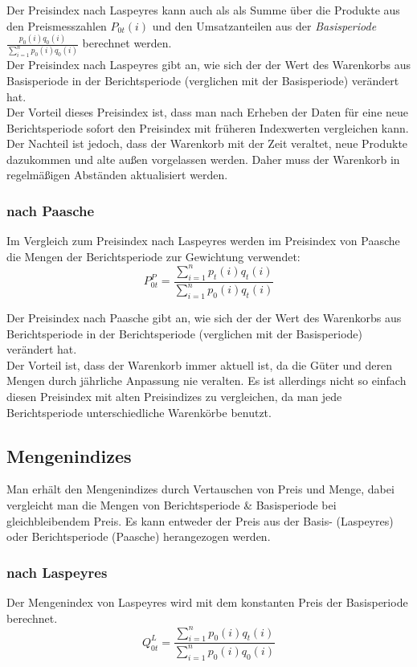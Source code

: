 \documentclass[a4paper]{article}
\newcommand\dangersign{%
 \makebox[1.8em][c]{%
 \makebox[0pt][c]{\raisebox{.15em}{\small!}}%
 \makebox[0pt][c]{\color{red}\Large$\triangle$}}}%
\begin{document}
\noindent \dangersign Der Preisindex nach Laspeyres kann auch als als Summe über die Produkte aus den Preismesszahlen $P_{0t}(i)$ und den Umsatzanteilen aus der \textit{Basisperiode} $\frac{p_0(i)q_0(i)}{\sum_{i=1}^n p_0(i)q_0(i)}$ berechnet werden. \\

\noindent Der Preisindex nach Laspeyres gibt an, wie sich der der Wert des Warenkorbs aus Basisperiode in der Berichtsperiode (verglichen mit der Basisperiode) verändert hat.\\
Der Vorteil dieses Preisindex ist, dass man nach Erheben der Daten für eine neue Berichtsperiode sofort den Preisindex mit früheren Indexwerten vergleichen kann. Der Nachteil ist jedoch, dass der Warenkorb mit der Zeit veraltet, neue Produkte dazukommen und alte außen vorgelassen werden. Daher muss der Warenkorb in regelmäßigen Abständen aktualisiert werden.

\subsubsection{nach Paasche}\label{sec:p-paasche}
Im Vergleich zum Preisindex nach Laspeyres werden im Preisindex von Paasche die Mengen der Berichtsperiode zur Gewichtung verwendet:
$$P_{0t}^P =\frac{\sum_{i=1}^n p_t(i)q_t(i)}{\sum_{i=1}^n p_0(i)q_t(i)}$$

\noindent Der Preisindex nach Paasche gibt an, wie sich der der Wert des Warenkorbs aus Berichtsperiode in der Berichtsperiode (verglichen mit der Basisperiode) verändert hat.\\
Der Vorteil ist, dass der Warenkorb immer aktuell ist, da die Güter und deren Mengen durch jährliche Anpassung nie veralten. Es ist allerdings nicht so einfach diesen Preisindex mit alten Preisindizes zu vergleichen, da man jede Berichtsperiode unterschiedliche Warenkörbe benutzt.

\subsection{Mengenindizes}\label{sec:menge}
Man erhält den Mengenindizes durch Vertauschen von Preis und Menge, dabei vergleicht man die Mengen von Berichtsperiode \& Basisperiode bei gleichbleibendem Preis. Es kann entweder der Preis aus der Basis- (Laspeyres) oder Berichtsperiode (Paasche) herangezogen werden.

\subsubsection{nach Laspeyres}\label{sec:q-laspeyres}
Der Mengenindex von Laspeyres wird mit dem konstanten Preis der Basisperiode berechnet.
$$Q_{0t}^L = \frac{\sum_{i=1}^n p_0(i)q_t(i)}{\sum_{i=1}^n p_0(i)q_0(i)}$$
\end{document}
